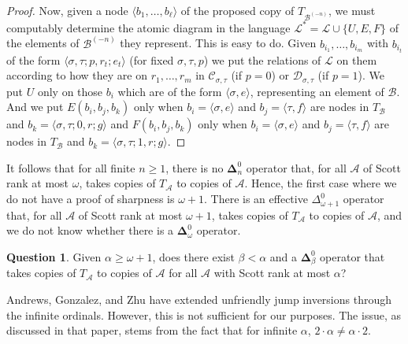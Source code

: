 \documentclass{article}
\newcommand{\Inv}[2]{{#2}^{(-#1)}}
\newcommand{\bfDelta}{\boldsymbol{\Delta}}
\theoremstyle{definition}
\newtheorem{question}[thm]{Question}
\begin{document}
\begin{proof}
		Now, given a node $\langle b_1,\ldots,b_\ell \rangle$ of the proposed copy of $T_{\Inv{n}{\mathcal{B}}}$, we must computably determine the atomic diagram in the language $\mathcal{L}^* = \mathcal{L} \cup \{ U,E,F\}$ of the elements of ${\Inv{n}{\mathcal{B}}}$ they represent. This is easy to do. Given $b_{i_1},\ldots,b_{i_m}$ with $b_{i_t}$ of the form $\langle \sigma,\tau; p, r_t ; e_t \rangle$ (for fixed $\sigma,\tau,p$) we put the relations of $\mathcal{L}$ on them according to how they are on $r_1,\ldots,r_m$ in $\mathcal{C}_{\sigma,\tau}$ (if $p = 0$) or $\mathcal{D}_{\sigma,\tau}$ (if $p = 1$). We put $U$ only on those $b_i$ which are of the form $\langle \sigma, e \rangle$, representing an element of $\mathcal{B}$. And we put $E(b_i,b_j,b_k)$ only when $b_i = \langle \sigma, e \rangle$ and $b_j = \langle \tau, f \rangle$ are nodes in $T_{\mathcal{B}}$ and $b_k = \langle \sigma,\tau; 0,r ; g \rangle$ and $F(b_i,b_j,b_k)$ only when $b_i = \langle \sigma , e \rangle$ and $b_j = \langle \tau , f \rangle$ are nodes in $T_{\mathcal{B}}$ and $b_k = \langle \sigma,\tau;1,r; g  \rangle$.
	\end{proof}
	
	It follows that for all finite $n\geq 1$, there is no $\bfDelta^0_n$ operator that, for all $\mathcal{A}$ of Scott rank at most $\omega$, takes copies of $T_\mathcal{A}$ to copies of $\mathcal{A}$. Hence, the first case where we do not have a proof of sharpness is $\omega+1$. There is an effective $\Delta^0_{\omega+1}$ operator that, for all $\mathcal{A}$ of Scott rank at most $\omega+1$, takes copies of $T_\mathcal{A}$ to copies of $\mathcal{A}$, and we do not know whether there is a $\bfDelta^0_\omega$ operator. %
	
	\begin{question}
		Given $\alpha\geq\omega+1$, does there exist $\beta < \alpha$ and a $\bfDelta^0_\beta$ operator that takes copies of $T_\mathcal{A}$ to copies of $\mathcal{A}$ for all $\mathcal{A}$ with Scott rank at most $\alpha$?
	\end{question}
	
	Andrews, Gonzalez, and Zhu \cite{belligerent} have extended unfriendly jump inversions through the infinite ordinals. However, this is not sufficient for our purposes. The issue, as discussed in that paper, stems from the fact that for infinite $\alpha$, $2 \cdot \alpha \neq \alpha \cdot 2$.
	
	
	
	
\end{document}
